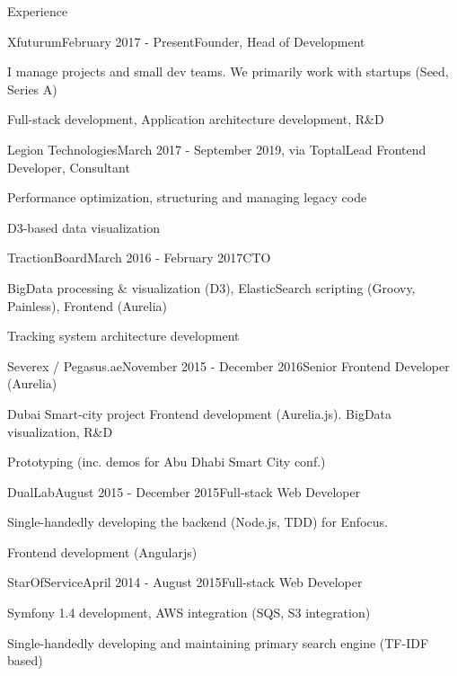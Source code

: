\documentclass{resume} %
\begin{document}
\begin{rSection}{Experience}

\begin{rSubsection}{Xfuturum}{February 2017 - Present}{Founder, Head of Development}{}
\item I manage projects and small dev teams. We primarily work with startups (Seed, Series A)
\item Full-stack development, Application architecture development, R\&D
\end{rSubsection}


\begin{rSubsection}{Legion Technologies}{March 2017 - September 2019, via Toptal}{Lead Frontend Developer, Consultant}{}
\item Performance optimization, structuring and managing legacy code
\item D3-based data visualization
\end{rSubsection}


\begin{rSubsection}{TractionBoard}{March 2016 - February 2017}{CTO}{}
\item BigData processing \& visualization (D3), ElasticSearch scripting (Groovy, Painless), Frontend (Aurelia)
\item Tracking system architecture development
\end{rSubsection}

\begin{rSubsection}{Severex / Pegasus.ae}{November 2015 - December 2016}{Senior Frontend Developer (Aurelia)}{}
\item Dubai Smart-city project Frontend development (Aurelia.js). BigData visualization, R\&D
\item Prototyping (inc. demos for Abu Dhabi Smart City conf.)
\end{rSubsection}

\begin{rSubsection}{DualLab}{August 2015 - December 2015}{Full-stack Web Developer}{}
\item Single-handedly developing the backend (Node.js, TDD) for Enfocus.
\item Frontend development (Angularjs)
\end{rSubsection}

\begin{rSubsection}{StarOfService}{April 2014 - August 2015}{Full-stack Web Developer}{}
\item Symfony 1.4 development, AWS integration (SQS, S3 integration)
\item Single-handedly developing and maintaining primary search engine (TF-IDF based)
\end{rSubsection}


\end{rSection}
\end{document}
